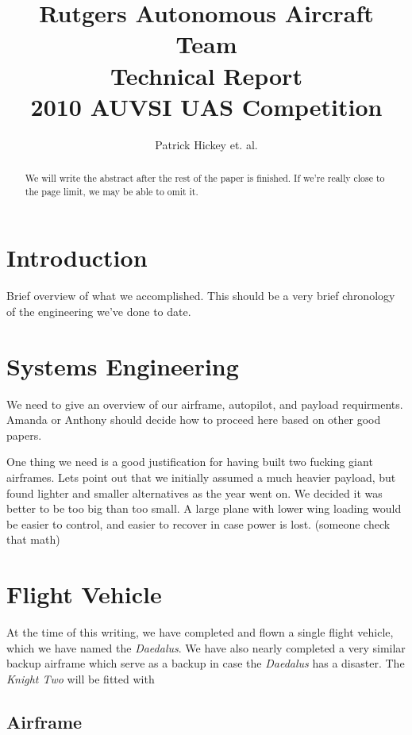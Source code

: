 \documentclass[10pt]{report}
\begin{document}
\title{Rutgers Autonomous Aircraft Team\\Technical Report\\2010 AUVSI UAS Competition}
\author{Patrick Hickey et. al.}


\begin{abstract}
We will write the abstract after the rest of the paper is finished. If we're really close to the page limit, we may be able to omit it.
\end{abstract}

\section{Introduction}

Brief overview of what we accomplished. This should be a very brief chronology of the engineering we've done to date.

\section{Systems Engineering}

We need to give an overview of our airframe, autopilot, and payload requirments. Amanda or Anthony should decide how to proceed here based on other good papers.

One thing we need is a good justification for having built two fucking giant airframes. Lets point out that we initially assumed a much heavier payload, but found lighter and smaller alternatives as the year went on. We decided it was better to be too big than too small. A large plane with lower wing loading would be easier to control, and easier to recover in case power is lost. (someone check that math)

\section{Flight Vehicle}

At the time of this writing, we have completed and flown a single flight vehicle, which we have named the \emph{Daedalus}.
We have also nearly completed a very similar backup airframe which serve as a backup in case the \emph{Daedalus} has a disaster. The \emph{Knight Two} will be fitted with 

\subsection{Airframe}
\end{document}
